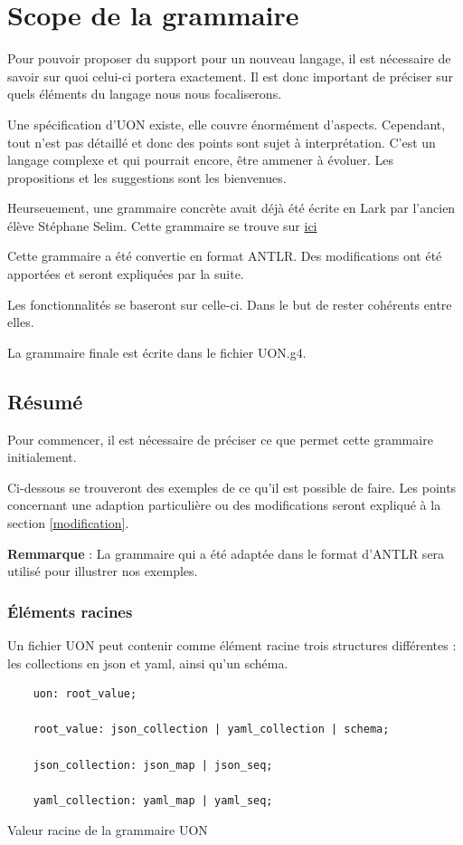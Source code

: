 \documentclass[
    iict, %
    il, %
]{heig-tb}
\begin{document}
\chapter{Scope de la grammaire}\label{grammar scope}
Pour pouvoir proposer du support pour un nouveau langage, il est nécessaire de savoir sur quoi celui-ci portera exactement.
Il est donc important de préciser sur quels éléments du langage nous nous focaliserons.

Une spécification d'UON existe, elle couvre énormément d'aspects. Cependant, tout n'est pas détaillé et donc des points sont sujet à interprétation.
C'est un langage complexe et qui pourrait encore, être ammener à évoluer. Les propositions et les suggestions sont les bienvenues.

Heurseuement, une grammaire concrète avait déjà été écrite en Lark par l'ancien élève Stéphane Selim.
Cette grammaire se trouve sur \href{https://github.com/uon-language/uon-parser/tree/master/grammar}{ici}

Cette grammaire a été convertie en format ANTLR. Des modifications ont été apportées et seront expliquées par la suite.

Les fonctionnalités se baseront sur celle-ci. Dans le but de rester cohérents entre elles.

La grammaire finale est écrite dans le fichier UON.g4.

\section{Résumé}
Pour commencer, il est nécessaire de préciser ce que permet cette grammaire initialement.

Ci-dessous se trouveront des exemples de ce qu'il est possible de faire.
Les points concernant une adaption particulière ou des modifications seront expliqué à la section \ref{modification}.

\textbf{Remmarque} : La grammaire qui a été adaptée dans le format d'ANTLR sera utilisé pour illustrer nos exemples.

\subsection{Éléments racines}

Un fichier UON peut contenir comme élément racine trois structures différentes : les collections en json et yaml, ainsi qu'un schéma.

\begin{listing}[!ht]
    \begin{verbatim}
    uon: root_value;

    root_value: json_collection | yaml_collection | schema;

    json_collection: json_map | json_seq;

    yaml_collection: yaml_map | yaml_seq;
    \end{verbatim}
    \caption{Valeur racine de la grammaire UON}
    \label{uon-root-value}
\end{listing}
\end{document}
